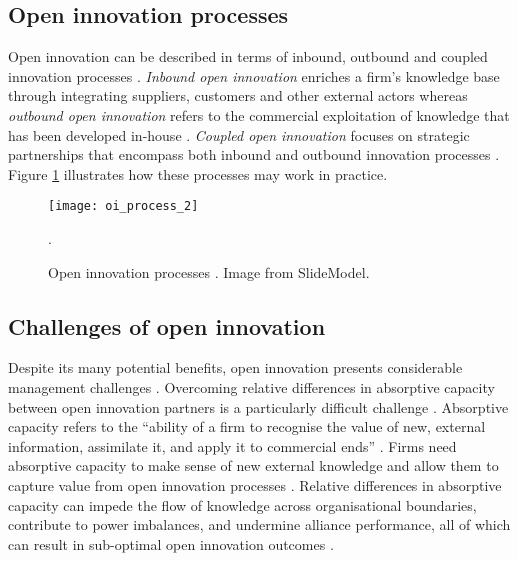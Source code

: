 \subsection{Open innovation processes}

Open innovation can be described in terms of inbound, outbound and coupled innovation processes \citep{chesbrough2006beyond,enkel2009open,gassmann2010future}. \emph{Inbound open innovation} enriches a firm’s knowledge base through integrating suppliers, customers and other external actors \citep{xu2013inbound} whereas \emph{outbound open innovation} refers to the commercial exploitation of knowledge that has been developed in-house \citep{de2016knowledge}. \emph{Coupled open innovation} focuses on strategic partnerships that encompass both inbound and outbound innovation processes \citep{spithoven2013open}. Figure \ref{fig:oi_process} illustrates how these processes may work in practice. \medskip

\begin{figure}
	\centering
	\texttt{[image: oi\_process\_2]}
	\caption{Open innovation processes \citep{chesbrough2004open}. Image from SlideModel\texttrademark.}.
	\label{fig:oi_process}
\end{figure}

\subsection{Challenges of open innovation}

Despite its many potential benefits, open innovation presents considerable management challenges \citep{hossain2013open,vanhaverbeke2014surfing}. Overcoming relative differences in absorptive capacity between open innovation partners is a particularly difficult challenge \citep{vanhaverbeke2007connecting,lakemond2016match}. Absorptive capacity refers to the \enquote{ability of a firm to recognise the value of new, external information, assimilate it, and apply it to commercial ends} \citep{cohen1990absorptive}. Firms need absorptive capacity to make sense of new external knowledge and allow them to capture value from open innovation processes \citep{vanhaverbeke2007connecting}. Relative differences in absorptive capacity can impede the flow of knowledge across organisational boundaries, contribute to power imbalances, and undermine alliance performance, all of which can result in sub-optimal open innovation outcomes \citep{szulanski1996exploring,lane1998relative,nooteboom2000learning,vanhaverbeke2007connecting,easterby2008absorptive,phelps2012knowledge}.\medskip 

